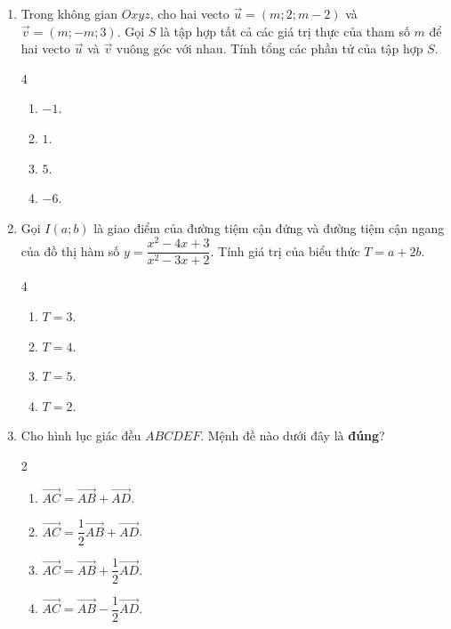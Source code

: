 \documentclass[12pt]{article}
\begin{document}
\begin{enumerate}[label=\textbf{Câu \arabic*.}, leftmargin=*]
		\item Trong không gian $Oxyz$, cho hai vecto $\vec{u} = (m; 2; m-2)$ và $\vec{v} = (m; -m; 3)$. Gọi $S$ là tập hợp tất cả các giá trị thực của tham số $m$ để hai vecto $\vec{u}$ và $\vec{v}$ vuông góc với nhau. Tính tổng các phần tử của tập hợp $S$.
		\begin{multicols}{4}
			\begin{enumerate}[label=\Alph*.]
				\item $-1$.
				\item $1$.
				\item $5$.
				\item $-6$.
			\end{enumerate}
		\end{multicols}
		
		\item Gọi $I(a; b)$ là giao điểm của đường tiệm cận đứng và đường tiệm cận ngang của đồ thị hàm số $y = \dfrac{x^2 - 4x + 3}{x^2 - 3x + 2}$. Tính giá trị của biểu thức $T = a + 2b$.
		\begin{multicols}{4}
			\begin{enumerate}[label=\Alph*.]
				\item $T = 3$.
				\item $T = 4$.
				\item $T = 5$.
				\item $T = 2$.
			\end{enumerate}
		\end{multicols}
		
		\item Cho hình lục giác đều $ABCDEF$. Mệnh đề nào dưới đây là \textbf{đúng}?
		\begin{multicols}{2}
			\begin{enumerate}[label=\Alph*.]
				\item $\overrightarrow{AC} = \overrightarrow{AB} + \overrightarrow{AD}$.
				\item $\overrightarrow{AC} = \dfrac{1}{2}\overrightarrow{AB} + \overrightarrow{AD}$.
				\item $\overrightarrow{AC} = \overrightarrow{AB} + \dfrac{1}{2}\overrightarrow{AD}$.
				\item $\overrightarrow{AC} = \overrightarrow{AB} - \dfrac{1}{2}\overrightarrow{AD}$.
			\end{enumerate}
		\end{multicols}
		

\end{enumerate}
\end{document}

